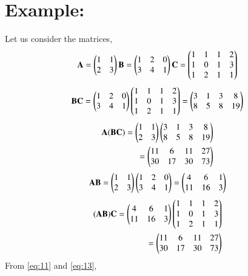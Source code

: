 \documentclass[journal,12pt,twocolumn]{IEEEtran}
\begin{document}
\section{Example:} Let us consider the matrices,
\begin{align}
    \mathbf{A}=\begin{pmatrix}1 & 1\\ 2 & 3\end{pmatrix} \mathbf{B}=\begin{pmatrix}1 & 2 & 0\\ 3 & 4 & 1\end{pmatrix} \mathbf{C}=\begin{pmatrix}1 & 1 & 1 & 2\\ 1 & 0 & 1 & 3\\ 1 & 2 & 1 & 1\end{pmatrix} \label{eq:9}
\end{align}
\begin{align}
    \mathbf{BC}=\begin{pmatrix}1 & 2 & 0\\ 3 & 4 & 1\end{pmatrix}\begin{pmatrix}1 & 1 & 1 & 2\\ 1 & 0 & 1 & 3\\ 1 & 2 & 1 & 1\end{pmatrix}=\begin{pmatrix}3 & 1 & 3 & 8\\ 8 & 5 & 8 & 19\end{pmatrix} \label{eq:10}
\end{align}
\begin{align}
   \mathbf{A(BC)}=\begin{pmatrix}1 & 1\\ 2 & 3\end{pmatrix}\begin{pmatrix}3 & 1 & 3 & 8\\ 8 & 5 & 8 & 19\end{pmatrix}\\=\begin{pmatrix}11 & 6 & 11 & 27\\ 30 & 17 & 30 & 73\end{pmatrix} \label{eq:11}
\end{align}
\begin{align}
    \mathbf{AB}=\begin{pmatrix}1 & 1\\ 2 & 3\end{pmatrix}\begin{pmatrix}1 & 2 & 0\\ 3 & 4 & 1\end{pmatrix}=\begin{pmatrix}4 & 6 & 1\\ 11 & 16 & 3 \end{pmatrix} \label{eq:12}
\end{align}
\begin{align}
    \mathbf{(AB)C}=\begin{pmatrix}4 & 6 & 1\\ 11 & 16 & 3 \end{pmatrix}\begin{pmatrix}1 & 1 & 1 & 2\\ 1 & 0 & 1 & 3\\ 1 & 2 & 1 & 1\end{pmatrix}\\=\begin{pmatrix}11 & 6 & 11 & 27\\ 30 & 17 & 30 & 73 \end{pmatrix} \label{eq:13}
\end{align}From \eqref{eq:11} and \eqref{eq:13}, \center{\boxed{\vec{[A(BC)]}=\vec{[(AB)C]}}} 
\end{document}
